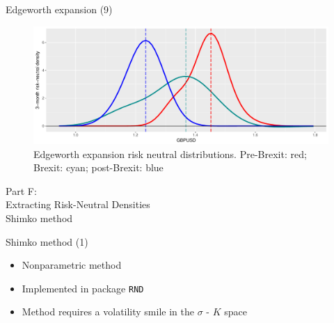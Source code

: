 \begin{frame}{Edgeworth expansion (9)}

\begin{figure}
\includegraphics[width=1\linewidth]{2018_02_07_IMF_FXCourse_files/figure-beamer/unnamed-chunk-67-1} \caption{Edgeworth expansion risk neutral distributions. Pre-Brexit: red; Brexit: cyan; post-Brexit: blue}\label{fig:unnamed-chunk-67}
\end{figure}

\end{frame}

\begin{frame}{}

\color{blue} \LARGE{Part F:}\\
\LARGE{Extracting Risk-Neutral Densities}\\
\Large{Shimko method}

\end{frame}

\begin{frame}[fragile]{Shimko method (1)}

\begin{itemize}
\tightlist
\item
  Nonparametric method
\item
  Implemented in package \texttt{RND}
\item
  Method requires a volatility smile in the \(\sigma\) - \(K\) space
\end{itemize}

\end{frame}

